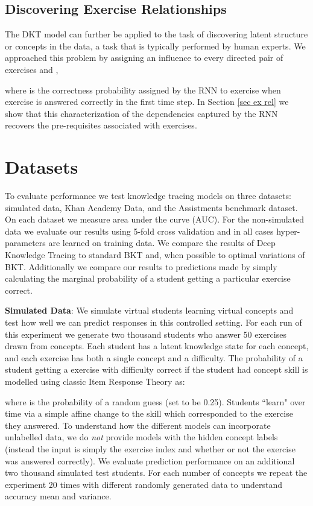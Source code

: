 \documentclass{article} \usepackage{nips,times}
\begin{document}
\subsection{Discovering Exercise Relationships}

The DKT model can further be applied to the task of discovering latent structure or concepts in the data, a task that is typically performed by human experts.
We approached this problem by assigning an influence  to every directed pair of exercises  and ,

where  is the correctness probability assigned by the RNN to exercise  when exercise  is answered correctly in the first time step.
In Section \ref{sec ex rel} we show that this characterization of the dependencies captured by the RNN recovers the pre-requisites associated with exercises.







\section{Datasets}

To evaluate performance we test knowledge tracing models on three datasets: simulated data, Khan Academy Data, and the Assistments benchmark dataset. On each dataset we measure area under the curve (AUC). For the non-simulated data we evaluate our results using 5-fold cross validation and in all cases hyper-parameters are learned on training data. We compare the results of Deep Knowledge Tracing to standard BKT and, when possible to optimal variations of BKT. Additionally we compare our results to predictions made by simply calculating the marginal probability of a student getting a particular exercise correct.

\textbf{Simulated Data}: We simulate virtual students learning virtual concepts and test how well we can predict responses in this controlled setting.
For each run of this experiment we generate two thousand students who answer 50 exercises drawn from  concepts.
Each student has a latent knowledge state for each concept, and each exercise has both a single concept and a difficulty.
The probability of a student getting a exercise with difficulty  correct if the student had concept skill  is modelled using classic Item Response Theory \cite{drasgow1990item} as:

where  is the probability of a random guess (set to be 0.25). Students ``learn" over time via a simple affine change to the skill which corresponded to the exercise they answered. To understand how the different models can incorporate unlabelled data, we do \emph{not} provide models with the hidden concept labels (instead the input is simply the exercise index and whether or not the exercise was answered correctly). We evaluate prediction performance on an additional two thousand simulated test students. For each number of concepts we repeat the experiment 20 times with different randomly generated data to understand accuracy mean and variance.
\end{document}
